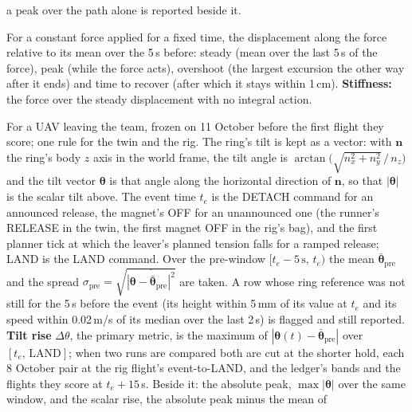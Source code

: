 \begin{description}
    a peak over the path alone is reported beside it.
    \item[Disturbance response] For a constant force applied for a fixed time, the displacement along the
    force relative to its mean over the 5\,s before: steady (mean over the last 5\,s of the force), peak
    (while the force acts), overshoot (the largest excursion the other way after it ends) and time to
    recover (after which it stays within 1\,cm). \textbf{Stiffness:} the force over the steady displacement
    with no integral action.
    \item[Release metrics] For a UAV leaving the team, frozen on 11 October before the first flight they
    score; one rule for the twin and the rig. The ring's tilt is kept as a vector: with $\mathbf{n}$ the ring's
    body $z$ axis in the world frame, the tilt angle is $\arctan\!\big(\sqrt{n_x^2+n_y^2}\,/\,n_z\big)$ and
    the tilt vector $\boldsymbol{\theta}$ is that angle along the horizontal direction of $\mathbf{n}$, so that
    $|\boldsymbol{\theta}|$ is the scalar tilt above. The event time $t_e$ is the DETACH command for an announced
    release, the magnet's OFF for an unannounced one (the runner's RELEASE in the twin, the first magnet OFF in
    the rig's bag), and the first planner tick at which the leaver's planned tension falls for a ramped release;
    LAND is the LAND command. Over the pre-window $[t_e-5\,\mathrm{s},\,t_e)$ the mean
    $\bar{\boldsymbol{\theta}}_{\mathrm{pre}}$ and the spread
    $\sigma_{\mathrm{pre}}=\sqrt{\overline{|\boldsymbol{\theta}-\bar{\boldsymbol{\theta}}_{\mathrm{pre}}|^2}}$
    are taken. A row whose ring reference was not still for the 5\,s before the event (its height within
    5\,mm of its value at $t_e$ and its speed within 0.02\,m/s of its median over the last 2\,s) is flagged and
    still reported. \textbf{Tilt rise} $\Delta\theta$, the primary metric, is the maximum of
    $|\boldsymbol{\theta}(t)-\bar{\boldsymbol{\theta}}_{\mathrm{pre}}|$ over $[t_e,\,\mathrm{LAND}]$; when two
    runs are compared both are cut at the shorter hold, each 8 October pair at the rig flight's event-to-LAND,
    and the ledger's bands and the flights they score at $t_e+15$\,s. Beside it: the absolute peak,
    $\max|\boldsymbol{\theta}|$ over the same window, and the scalar rise, the absolute peak minus the mean of

\end{description}
